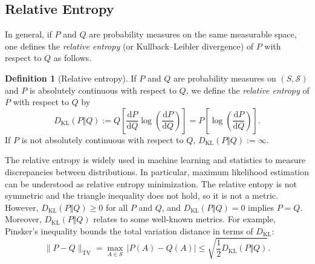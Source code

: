 \documentclass[reqno]{amsart}
\newcommand{\1}{\mathds{1}}
\renewcommand{\d}{\mathrm{d}}
\newcommand{\dkl}{D_{\mathrm{KL}}}
\theoremstyle{definition}
\newtheorem{definition}{Definition}
\theoremstyle{remark}
\begin{document}
\subsection{Relative Entropy}
\label{sec: relative entropy in path space}

In general, if $P$ and $Q$ are probability measures on the same measurable space, one defines the \emph{relative entropy} (or Kullback--Leibler divergence) of $P$ with respect to $Q$ as follows.

\begin{definition}[Relative entropy]
  If $P$ and $Q$ are  probability measures on $(S, \mathscr{S})$ and $P$ is absolutely continuous with respect to $Q$, we define the \emph{relative entropy} of $P$ with respect to $Q$ by
  \begin{equation*}
    \dkl(P \Vert Q) := Q \left [ \frac{\d P}{\d Q} \log \left ( \frac{\d P}{\d Q} \right )  \right ] = P \left [\log \left ( \frac{\d P}{\d Q} \right ) \right ]. 
  \end{equation*}
  If $P$ is not absolutely continuous with respect to $Q$, $\dkl(P \Vert Q) := \infty$. 
\end{definition}

The relative entropy is widely used in machine learning and statistics to measure discrepancies between distributions. In particular, maximum likelihood estimation can be understood as relative entropy minimization. The relative entopy is not symmetric and the triangle inequality does not hold, so it is not a metric. However, $\dkl (P \Vert Q) \geq 0$ for all $P$ and $Q$, and $\dkl (P \Vert Q)=0$ implies $P =Q$. Moreover, $\dkl (P \Vert Q)$ relates to some well-known metrics. For example, Pinsker's inequality bounds the total variation distance in terms of $\dkl$:
\begin{equation*}
  \lVert P-Q \rVert_{\mathrm{TV}}= \max_{A \in \mathscr{S}} \, \lvert P(A)- Q(A) \rvert \leq \sqrt{\frac12 \dkl(P \Vert Q)}.
\end{equation*}
\end{document}
